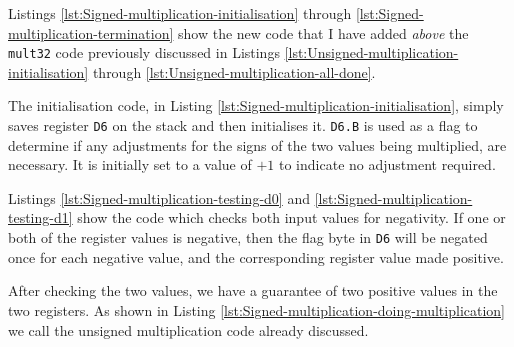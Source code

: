 Listings \ref{lst:Signed-multiplication-initialisation} through \ref{lst:Signed-multiplication-termination}
show the new code that I have added \emph{above} the \texttt{mult32}
code previously discussed in Listings \ref{lst:Unsigned-multiplication-initialisation}
through \ref{lst:Unsigned-multiplication-all-done}.



The initialisation code, in Listing \ref{lst:Signed-multiplication-initialisation},
simply saves register \texttt{D6} on the stack and then initialises
it. \texttt{D6.B} is used as a flag to determine if any adjustments
for the signs of the two values being multiplied, are necessary. It
is initially set to a value of $+1$ to indicate no adjustment required.





Listings \ref{lst:Signed-multiplication-testing-d0} and \ref{lst:Signed-multiplication-testing-d1}
show the code which checks both input values for negativity. If one
or both of the register values is negative, then the flag byte in
\texttt{D6} will be negated once for each negative value, and the
corresponding register value made positive.



After checking the two values, we have a guarantee of two positive
values in the two registers. As shown in Listing \ref{lst:Signed-multiplication-doing-multiplication}
we call the unsigned multiplication code already discussed.



